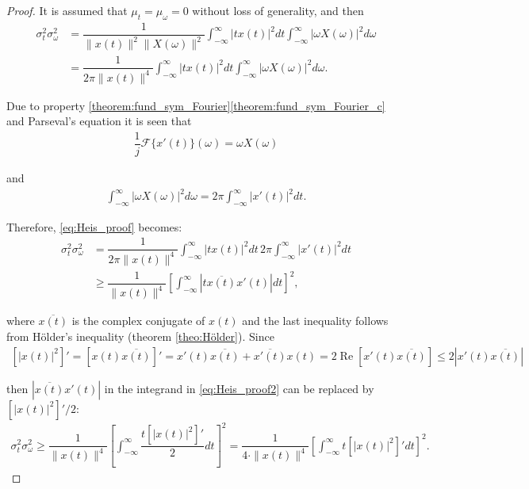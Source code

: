 \begin{proof}
It is assumed that $\mu_t = \mu_\omega = 0$ without loss of generality, and then
\begin{align} \label{eq:Heis_proof}
\sigma_t^2 \sigma_\omega^2 &= \dfrac{1}{\|x(t)\|^2 \|X(\omega)\|^2} \int_{-\infty}^\infty |tx(t)|^2 dt \int_{-\infty}^\infty |\omega X(\omega)|^2 d\omega \nonumber \\
&= \dfrac{1}{2\pi\|x(t)\|^4} \int_{-\infty}^\infty |tx(t)|^2 dt \int_{-\infty}^\infty |\omega X(\omega)|^2 d\omega.
\end{align}

Due to property \ref{theorem:fund_sym_Fourier}\ref{theorem:fund_sym_Fourier_c} and Parseval's equation it is seen that
\begin{align*}
\dfrac{1}{j} \mathcal{F}\{x'(t)\}(\omega) = \omega X(\omega)
\end{align*}

and
\begin{align*}
\int_{-\infty}^\infty |\omega X(\omega)|^2 d\omega = 2\pi \int_{-\infty}^\infty |x'(t)|^2 dt.
\end{align*}

Therefore, \eqref{eq:Heis_proof} becomes:
\begin{align} \label{eq:Heis_proof2}
\sigma_t^2 \sigma_\omega^2 &= \dfrac{1}{2\pi \|x(t)\|^4} \int_{-\infty}^\infty |tx(t)|^2 dt\,2\pi \int_{-\infty}^\infty | x'(t)|^2 dt \nonumber \\
&\geq \dfrac{1}{\|x(t)\|^4} \left[ \int_{-\infty}^\infty \left| t \overline{x(t)} x'(t) \right| dt \right]^2,
\end{align}

where $\overline{x(t)}$ is the complex conjugate of $x(t)$ and the last inequality follows from Hölder's inequality (theorem \ref{theo:Hölder}). Since
\begin{align*}
\left[ |x(t)|^2 \right]' = \left[ x(t) \overline{x(t)} \right]' = x'(t) \overline{x(t)} + \overline{x'(t)} x(t) = 2 \operatorname{Re} \left[ x'(t) \overline{x(t)} \right] \leq 2 \left| x'(t) \overline{x(t)} \right|
\end{align*}

then $\left| \overline{x(t)} x'(t) \right|$ in the integrand in \eqref{eq:Heis_proof2} can be replaced by $\left[ |x(t)|^2 \right]'/2$:
\begin{align} \label{eq:Heis_proof3}
\sigma_t^2 \sigma_\omega^2 \geq \dfrac{1}{\|x(t)\|^4} \left[ \int_{-\infty}^\infty \dfrac{t \left[ |x(t)|^2 \right]'}{2} dt \right]^2 = \dfrac{1}{4 \cdot \|x(t)\|^4} \left[ \int_{-\infty}^\infty t \left[ |x(t)|^2 \right]' dt \right]^2.
\end{align}


\end{proof}
